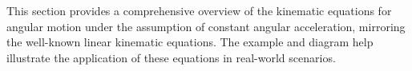 \documentclass[12pt]{article}
\begin{document}
This section provides a comprehensive overview of the kinematic equations for angular motion under the assumption of constant angular acceleration, mirroring the well-known linear kinematic equations. The example and diagram help illustrate the application of these equations in real-world scenarios.
\end{document}
